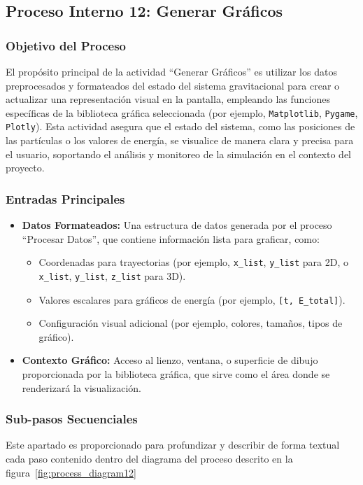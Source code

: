 \subsection{Proceso Interno 12: Generar Gráficos}

\subsubsection{Objetivo del Proceso}
El propósito principal de la actividad ``Generar Gráficos'' es utilizar los datos preprocesados y formateados del estado del sistema gravitacional para crear o actualizar una representación visual en la pantalla, empleando las funciones específicas de la biblioteca gráfica seleccionada (por ejemplo, \texttt{Matplotlib}, \texttt{Pygame}, \texttt{Plotly}). Esta actividad asegura que el estado del sistema, como las posiciones de las partículas o los valores de energía, se visualice de manera clara y precisa para el usuario, soportando el análisis y monitoreo de la simulación en el contexto del proyecto.

\subsubsection{Entradas Principales}
\begin{itemize}
    \item \textbf{Datos Formateados:}
    Una estructura de datos generada por el proceso ``Procesar Datos'', que contiene información lista para graficar, como:
    \begin{itemize}
        \item Coordenadas para trayectorias (por ejemplo, \texttt{x\_list}, \texttt{y\_list} para 2D, o \texttt{x\_list}, \texttt{y\_list}, \texttt{z\_list} para 3D).
        \item Valores escalares para gráficos de energía (por ejemplo, \texttt{[t, E\_total]}).
        \item Configuración visual adicional (por ejemplo, colores, tamaños, tipos de gráfico).
    \end{itemize}
    \item \textbf{Contexto Gráfico:}
    Acceso al lienzo, ventana, o superficie de dibujo proporcionada por la biblioteca gráfica, que sirve como el área donde se renderizará la visualización.
\end{itemize}

\subsubsection{Sub-pasos Secuenciales}
Este apartado es proporcionado para profundizar y describir de forma textual cada paso contenido dentro del diagrama del proceso descrito en la figura~\ref{fig:process_diagram12}
